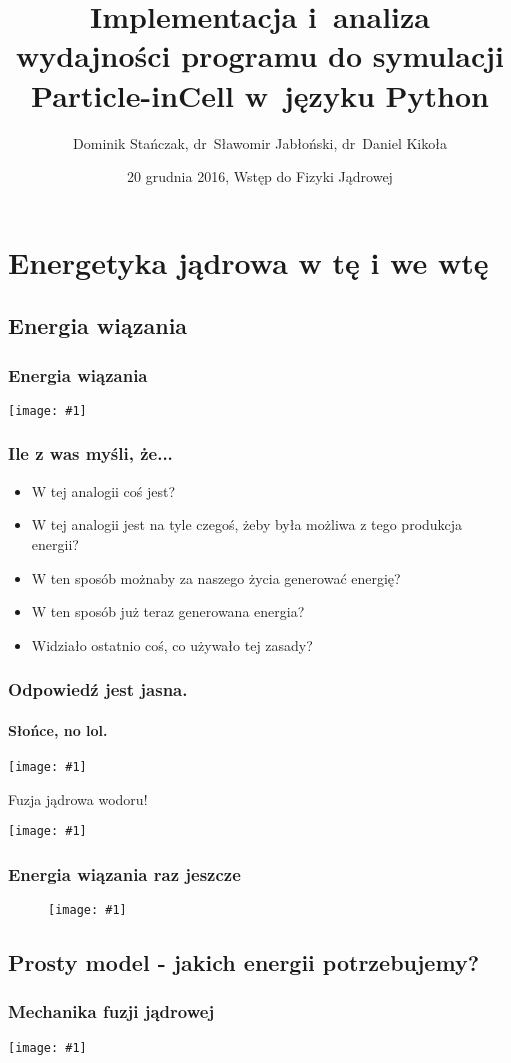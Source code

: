 \documentclass{beamer}
\title[PIC w~Pythonie]{Implementacja i~analiza wydajności programu do symulacji Particle-in\dywiz Cell w~języku Python}
\institute{Politechnika Warszawska}
\author{Dominik Stańczak, dr~Sławomir Jabłoński, dr~Daniel Kikoła}
\date{20 grudnia 2016, Wstęp do Fizyki Jądrowej}
\newcommand {\framedgraphic}[1] {
        \begin{center}
            \texttt{[image: \#1]}
        \end{center}
}
\begin{document}
  \frame{\titlepage}

  \section{Energetyka jądrowa w tę i we wtę}
  \subsection{Energia wiązania}

  \begin{frame}
    \frametitle{Energia wiązania}
    \framedgraphic{img/binding_energy.png}
  \end{frame}


  \begin{frame}
    \frametitle{Ile z was myśli, że...}
    \begin{itemize}[<+->]
      \item W tej analogii coś jest?
      \item W tej analogii jest na tyle czegoś, żeby była możliwa z tego produkcja energii?
      \item W ten sposób możnaby za naszego życia generować energię?
      \item W ten sposób już teraz generowana energia?
      \item Widziało ostatnio coś, co używało tej zasady?
    \end{itemize}
   \end{frame}


  \begin{frame}
    \frametitle{Odpowiedź jest jasna.}
    \framesubtitle{Słońce, no lol.}
    \framedgraphic{img/large_sun}
  \end{frame}
  \begin{frame}[t]{Fuzja jądrowa wodoru!}
    \framedgraphic{img/hh_fusion}
  \end{frame}


  \begin{frame}
    \frametitle{Energia wiązania raz jeszcze}
    \begin{figure}
      \framedgraphic{img/binding_energy_star}
    \end{figure}
  \end{frame}

  \subsection{Prosty model - jakich energii potrzebujemy?}
  \begin{frame}
    \frametitle{Mechanika fuzji jądrowej}
    \framedgraphic{img/energia1.png}
  \end{frame}
\end{document}

